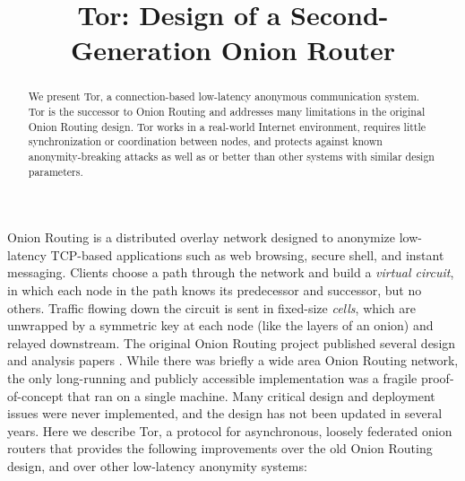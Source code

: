 \documentclass[times,10pt,twocolumn]{article}
\begin{document}

\title{Tor: Design of a Second-Generation Onion Router}


\maketitle
\thispagestyle{empty}

\begin{abstract}
We present Tor, a connection-based low-latency anonymous communication
system. Tor is the successor to Onion Routing
and addresses many limitations in the original Onion Routing design.
Tor works in a real-world Internet environment,
requires little synchronization or coordination between nodes, and
protects against known anonymity-breaking attacks as well
as or better than other systems with similar design parameters.
\end{abstract}



\label{sec:intro}

Onion Routing is a distributed overlay network designed to anonymize
low-latency TCP-based applications such as web browsing, secure shell,
and instant messaging. Clients choose a path through the network and
build a \emph{virtual circuit}, in which each node in the path knows its
predecessor and successor, but no others. Traffic flowing down the circuit
is sent in fixed-size \emph{cells}, which are unwrapped by a symmetric key
at each node (like the layers of an onion) and relayed downstream. The
original Onion Routing project published several design and analysis
papers
\cite{or-jsac98,or-discex00,or-ih96,or-pet00}. While there was briefly
a wide area Onion Routing network,
the only long-running and publicly accessible
implementation was a fragile proof-of-concept that ran on a single
machine. Many critical design and deployment issues were never implemented,
and the design has not been updated in several years.
Here we describe Tor, a protocol for asynchronous, loosely
federated onion routers that provides the following improvements over
the old Onion Routing design, and over other low-latency anonymity systems:
\end{document}

